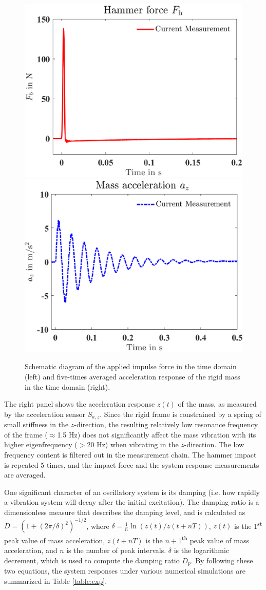 \documentclass[10pt]{asme2ej}
\begin{document}
\begin{figure}
	\centering
	\includegraphics[width=.45\linewidth]{figures/figure_9a.eps}
	\includegraphics[width=.45\linewidth]{figures/figure_9b.eps}
	\captionsetup{width=.85\linewidth}
	\caption{Schematic diagram of the applied impulse force in the time domain (left) and five-times averaged acceleration response of the rigid mass in the time domain (right).}
	\label{fig:impulse-vibration}
\end{figure}
%
The right panel shows the acceleration response $\ddot z(t)$ of the mass, as measured by the acceleration sensor $S_{a,z}$. 
%
Since the rigid frame is constrained by a spring of small stiffness in the $z$-direction, the resulting relatively low resonance frequency of the frame ($\approx$1.5 Hz) does not significantly affect the mass vibration with its higher eigenfrequency ($>$20 Hz) when vibrating in the $z$-direction.
%
The low frequency content is filtered out in the measurement chain.
%
The hammer impact is repeated 5 times, and the impact force and the system response measurements are averaged. 
%

%
One significant character of an oscillatory system is its damping (i.e. how rapidly a vibration system will decay after the initial excitation). 
%
The damping ratio is a dimensionless measure that describes the damping level, and is calculated as $D=\left( 1+\left(2\pi/\delta\right)^2\right)^{-1/2} $, where $\delta = \frac 1n \ln \left( {\ddot z(t)}/{\ddot z(t+nT)}  \right)$, $\ddot z(t)$ is the 1\textsuperscript{st} peak value of mass acceleration, $\ddot z(t + nT)$ is the $n+1$\textsuperscript{th} peak value of mass acceleration, and $n$ is the number of peak intervals. $\delta$ is the logarithmic decrement, which is used to compute the damping ratio $D_p$. By following these two equations, the system responses under various numerical simulations are summarized in Table \ref{table:exp}.
%
\end{document}
